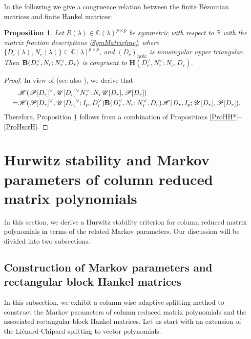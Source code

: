 \documentclass[12pt,reqno]{amsart}
\theoremstyle{plain}
\newtheorem{proposition}[theorem]{Proposition}
\numberwithin{equation}{section}
\theoremstyle{remark}
\begin{document}
In the following we give a congruence relation between the finite B\'ezoutian matrices and finite Hankel matrices:

\begin{proposition}\label{LemBH}
Let $R(\lambda)\in \mathbb C(\lambda)^{p\times p}$ be symmetric with respect to $\mathbb R$ with the matrix fraction descriptions \eqref{SymMatrixfrac},
where $\{D_r(\lambda), N_r(\lambda)\}\subseteq \mathbb C[\lambda]^{p\times p}$, and $(D_r)_{\mathrm{hcdc}}$ is nonsingular upper triangular. Then
$
{\bf B}(D_r^{\vee},N_r;N_r^{\vee}, D_r)$
is congruent to
$ \mathbf{H}(D_r^{\vee},N_r^{\vee};N_r,D_r).
$
\end{proposition}


\begin{proof}

In view of \cite[Lemma 32]{BPV} (see also \cite[Theorem 31 (c) (ii)]{BPV}), we derive that
\begin{align*}
&\mathscr{H}(\mathscr P[D_r]^{\vee},\mathscr U[D_r]^{\vee} N_r^{\vee};N_r \mathscr U[D_r],\mathscr P[D_r])\\
=&\mathscr{H}(\mathscr P[D_r]^{\vee},\mathscr U[D_r]^{\vee} ;I_p,D_r^{\vee}) {\bf B}(D_r^{\vee},N_r;N_r^{\vee}, D_r) \mathscr{H}(D_r,I_p;\mathscr U[D_r],\mathscr P[D_r]).
\end{align*}
Therefore, Proposition \ref{LemBH} follows from a combination of  Propositions \ref{ProHH*}--\ref{ProHscrH}.

\end{proof}


\section{Hurwitz stability and Markov parameters of column reduced matrix polynomials}\label{sec4}

In this section, we derive a Hurwitz stability criterion for column reduced matrix polynomials in terms of the related Markov parameters. Our discussion will be divided into two subsections.

\subsection{Construction of Markov parameters and rectangular block Hankel matrices}\label{subsec4.1}

In this subsection, we exhibit a column-wise adaptive splitting method to construct the Markov parameters of column reduced matrix polynomials and the associated rectangular block Hankel matrices. Let us start with an extension of the Li\'{e}nard-Chipard splitting to vector polynomials.
\end{document}
